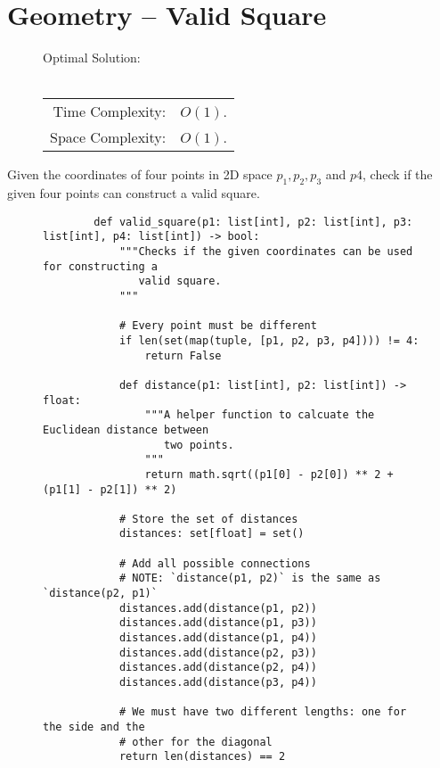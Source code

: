 
\section{Geometry -- Valid Square}

\begin{figure}[H]
    Optimal Solution:\\\\
    \begin{tabular}{rl}
        Time Complexity:& \(O(1)\).\\
        Space Complexity:& \(O(1)\).
    \end{tabular}
\end{figure}

Given the coordinates of four points in 2D space \(p_1, p_2, p_3\) and \(p4\),
check if the given four points can construct a valid square.

\begin{figure}[H]
    \centering
    \begin{verbatim}
        def valid_square(p1: list[int], p2: list[int], p3: list[int], p4: list[int]) -> bool:
            """Checks if the given coordinates can be used for constructing a
               valid square.
            """

            # Every point must be different
            if len(set(map(tuple, [p1, p2, p3, p4]))) != 4:
                return False

            def distance(p1: list[int], p2: list[int]) -> float:
                """A helper function to calcuate the Euclidean distance between
                   two points.
                """
                return math.sqrt((p1[0] - p2[0]) ** 2 + (p1[1] - p2[1]) ** 2)

            # Store the set of distances
            distances: set[float] = set()

            # Add all possible connections
            # NOTE: `distance(p1, p2)` is the same as `distance(p2, p1)`
            distances.add(distance(p1, p2))
            distances.add(distance(p1, p3))
            distances.add(distance(p1, p4))
            distances.add(distance(p2, p3))
            distances.add(distance(p2, p4))
            distances.add(distance(p3, p4))

            # We must have two different lengths: one for the side and the
            # other for the diagonal
            return len(distances) == 2
    \end{verbatim}
\end{figure}
